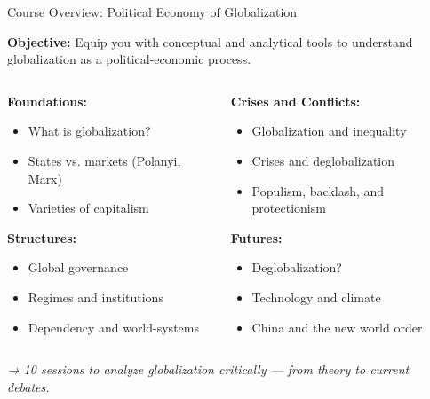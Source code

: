 \documentclass{beamer}
\begin{document}
\begin{frame}{Course Overview: Political Economy of Globalization}

\small
\textbf{Objective:} Equip you with conceptual and analytical tools to understand globalization as a political-economic process.

\vspace{0.5em}
\begin{columns}[T,onlytextwidth]
    \begin{column}{0.48\textwidth}
        \textbf{Foundations:}
        \begin{itemize}
            \item What is globalization?
            \item States vs. markets (Polanyi, Marx)
            \item Varieties of capitalism
        \end{itemize}

        \textbf{Structures:}
        \begin{itemize}
            \item Global governance
            \item Regimes and institutions
            \item Dependency and world-systems
        \end{itemize}
    \end{column}

    \begin{column}{0.48\textwidth}
        \textbf{Crises and Conflicts:}
        \begin{itemize}
            \item Globalization and inequality
            \item Crises and deglobalization
            \item Populism, backlash, and protectionism
        \end{itemize}

        \textbf{Futures:}
        \begin{itemize}
            \item Deglobalization?
            \item Technology and climate
            \item China and the new world order
        \end{itemize}
    \end{column}
\end{columns}

\vspace{0.5em}
\centering
\scriptsize
\textit{→ 10 sessions to analyze globalization critically — from theory to current debates.}
\end{frame}
\end{document}
